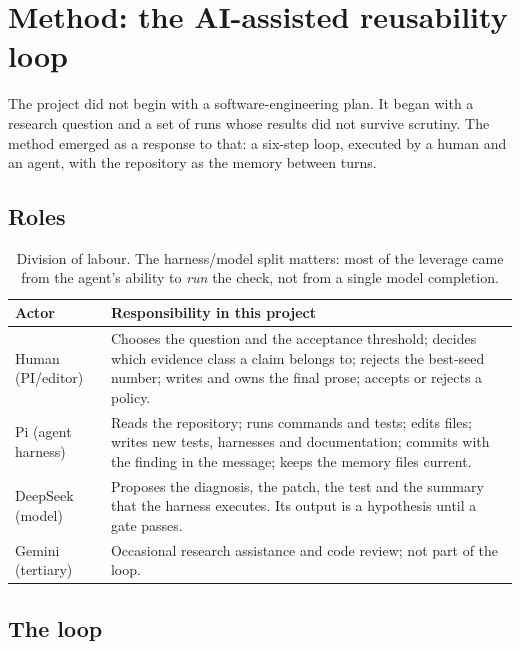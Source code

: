 \section{Method: the AI-assisted reusability loop}
\label{sec:method}

The project did not begin with a software-engineering plan. It began with a
research question and a set of runs whose results did not survive scrutiny. The
method emerged as a response to that: a six-step loop, executed by a human and
an agent, with the repository as the memory between turns.

\subsection{Roles}
\label{sec:roles}

\begin{table}[htbp]
\centering
\small
\begin{tabularx}{\textwidth}{@{}lX@{}}
\toprule
Actor & Responsibility in this project \\
\midrule
Human (PI/editor) &
Chooses the question and the acceptance threshold; decides which evidence
class a claim belongs to; rejects the best-seed number; writes and owns the
final prose; accepts or rejects a policy. \\
Pi (agent harness) &
Reads the repository; runs commands and tests; edits files; writes new tests,
harnesses and documentation; commits with the finding in the message; keeps the
memory files current. \\
DeepSeek (model) &
Proposes the diagnosis, the patch, the test and the summary that the harness
executes. Its output is a hypothesis until a gate passes. \\
Gemini (tertiary) &
Occasional research assistance and code review; not part of the loop. \\
\bottomrule
\end{tabularx}
\caption{Division of labour. The harness/model split matters: most of the
leverage came from the agent's ability to \emph{run} the check, not from a
single model completion.}
\label{tab:roles}
\end{table}

\subsection{The loop}
\label{sec:loop}

